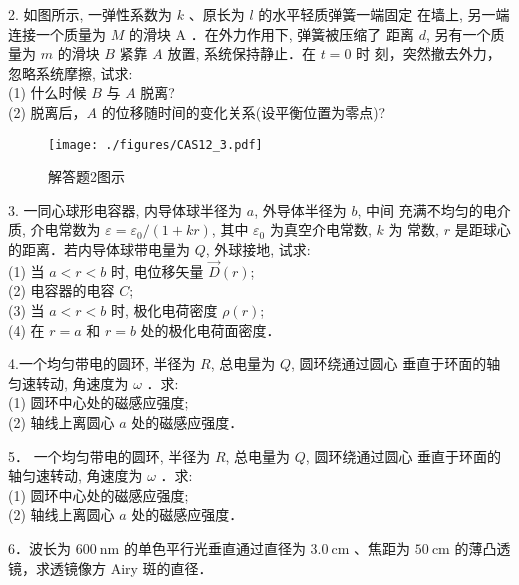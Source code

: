 2. 如图所示, 一弹性系数为 $k$ 、原长为 $l$ 的水平轻质弹簧一端固定 在墙上, 另一端连接一个质量为 $M$ 的滑块 $\mathrm{A}$ ．在外力作用下, 弹簧被压缩了 距离 $d$, 另有一个质量为 $m$ 的滑块 $B$ 紧靠 $A$ 放置, 系统保持静止．在 $t=0$ 时 刻，突然撤去外力，忽略系统摩擦, 试求:\\
(1) 什么时候 $B$ 与 $A$ 脱离?\\
(2) 脱离后，$A$ 的位移随时间的变化关系(设平衡位置为零点)?
\begin{figure}[ht]
\centering
\texttt{[image: ./figures/CAS12\_3.pdf]}
\caption{解答题2图示} \label{CAS12_fig3}
\end{figure}
3. 一同心球形电容器, 内导体球半径为 $a$, 外导体半径为 $b$, 中间 充满不均匀的电介质, 介电常数为 $\varepsilon=\varepsilon_{0} /(1+k r)$, 其中 $\varepsilon_{0}$ 为真空介电常数, $k$ 为 常数, $r$ 是距球心的距离．若内导体球带电量为 $Q$, 外球接地, 试求:\\
(1) 当 $a<r< b$ 时, 电位移矢量 $\vec{D}(r)$; \\
(2) 电容器的电容 $C$; \\
(3) 当 $a<r< b$ 时, 极化电荷密度 $\rho(r)$; \\
(4) 在 $r=a$ 和 $r=b$ 处的极化电荷面密度．

4.一个均匀带电的圆环, 半径为 $R$, 总电量为 $Q$, 圆环绕通过圆心
垂直于环面的轴匀速转动, 角速度为 $\omega$ ．求:\\
(1) 圆环中心处的磁感应强度;\\
(2) 轴线上离圆心 $a$ 处的磁感应强度．

5． 一个均匀带电的圆环, 半径为 $R$, 总电量为 $Q$, 圆环绕通过圆心 垂直于环面的轴匀速转动, 角速度为 $\omega$ ．求:\\
(1) 圆环中心处的磁感应强度;\\
(2) 轴线上离圆心 $a$ 处的磁感应强度．

6．波长为 $600 \mathrm{~nm}$ 的单色平行光垂直通过直径为 $3.0 \mathrm{~cm}$ 、焦距为 $50 \mathrm{~cm}$ 的薄凸透镜，求透镜像方 Airy 斑的直径．